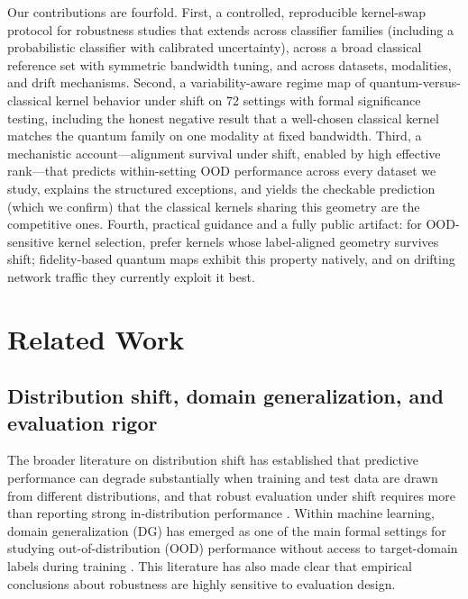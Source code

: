 \documentclass[journal]{IEEEtran}
\begin{document}
Our contributions are fourfold. First, a controlled, reproducible kernel-swap protocol for robustness studies that extends across classifier families (including a probabilistic classifier with calibrated uncertainty), across a broad classical reference set with symmetric bandwidth tuning, and across datasets, modalities, and drift mechanisms. Second, a variability-aware regime map of quantum-versus-classical kernel behavior under shift on 72 settings with formal significance testing, including the honest negative result that a well-chosen classical kernel matches the quantum family on one modality at fixed bandwidth. Third, a mechanistic account---alignment survival under shift, enabled by high effective rank---that predicts within-setting OOD performance across every dataset we study, explains the structured exceptions, and yields the checkable prediction (which we confirm) that the classical kernels sharing this geometry are the competitive ones. Fourth, practical guidance and a fully public artifact: for OOD-sensitive kernel selection, prefer kernels whose label-aligned geometry survives shift; fidelity-based quantum maps exhibit this property natively, and on drifting network traffic they currently exploit it best.

\section{Related Work}
\label{sec:related_work}

\subsection{Distribution shift, domain generalization, and evaluation rigor}

The broader literature on distribution shift has established that predictive performance can degrade substantially when training and test data are drawn from different distributions, and that robust evaluation under shift requires more than reporting strong in-distribution performance \cite{quinonero-candela2008datasetshift,shimodaira2000covariateshift,sugiyama2007iwcv}. Within machine learning, domain generalization (DG) has emerged as one of the main formal settings for studying out-of-distribution (OOD) performance without access to target-domain labels during training \cite{zhou2023dgsurvey}. This literature has also made clear that empirical conclusions about robustness are highly sensitive to evaluation design.
\end{document}
